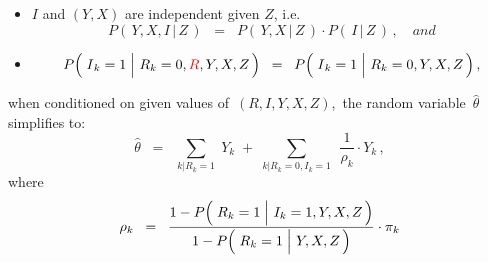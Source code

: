 \begin{proposition}
\begin{enumerate}
	\begin{itemize}
	\item
		$I$ and $(Y,X)$ are independent given $Z$, i.e.
		\begin{equation*}
		P\!\left(\,Y,X,I\,\vert\,Z\,\right)
		\;\; = \;\;
			P\!\left(\,Y,X\,\vert\,Z\,\right)
			\cdot
			P\!\left(\,I\,\vert\,Z\,\right)\,,
			\quad
			\textit{and}
		\end{equation*}
	\item
		\begin{equation*}
		P\!\left(\,\left.\overset{{\color{white}.}}{I}_{k} = 1\;\right\vert\,R_{k}=0,{\color{red}R},Y,X,Z\,\right)
		\;\; = \;\;
			P\!\left(\,\left.\overset{{\color{white}.}}{I}_{k} = 1\;\right\vert\,R_{k}=0,Y,X,Z\,\right),
		\end{equation*}
	\end{itemize}
	when conditioned on given values of \,$(R,I,Y,X,Z)$,\, the random variable \,$\widehat{\theta}$\, simplifies to:
	\begin{equation*}
	\widehat{\theta}
	\;\; = \;\;
		\underset{k\vert R_{k}=1}{\sum}\; Y_{k}
		\; + \;
		\underset{k\vert R_{k}=0,I_{k}=1}{\sum}\;\, \dfrac{1}{\rho_{k}}\cdot Y_{k}\,,
	\end{equation*}
	where
	\begin{equation*}
	\rho_{k}
	\;\; = \;\;
		\dfrac{
			1 - P\!\left(\,\left.\overset{{\color{white}.}}{R}_{k}=1\;\right\vert\,I_{k}=1,Y,X,Z\,\right)
			}{
			1 - P\!\left(\,\left.\overset{{\color{white}.}}{R}_{k}=1\;\right\vert\,Y,X,Z\,\right)
			}
		\cdot
		\pi_{k}
	\end{equation*}
\end{enumerate}
\end{proposition}
\proof
